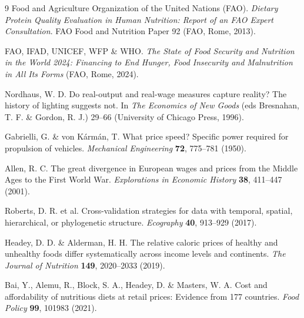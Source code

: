 \documentclass[11pt,a4paper]{article}
\begin{document}
\begin{thebibliography}{9}
Food and Agriculture Organization of the United Nations (FAO). \textit{Dietary Protein Quality Evaluation in Human Nutrition: Report of an FAO Expert Consultation}. FAO Food and Nutrition Paper 92 (FAO, Rome, 2013).

FAO, IFAD, UNICEF, WFP \& WHO. \textit{The State of Food Security and Nutrition in the World 2024: Financing to End Hunger, Food Insecurity and Malnutrition in All Its Forms} (FAO, Rome, 2024).

Nordhaus, W. D. Do real-output and real-wage measures capture reality? The history of lighting suggests not. In \textit{The Economics of New Goods} (eds Bresnahan, T. F. \& Gordon, R. J.) 29--66 (University of Chicago Press, 1996).

Gabrielli, G. \& von K\'arm\'an, T. What price speed? Specific power required for propulsion of vehicles. \textit{Mechanical Engineering} \textbf{72}, 775--781 (1950).

Allen, R. C. The great divergence in European wages and prices from the Middle Ages to the First World War. \textit{Explorations in Economic History} \textbf{38}, 411--447 (2001).

Roberts, D. R. et al. Cross-validation strategies for data with temporal, spatial, hierarchical, or phylogenetic structure. \textit{Ecography} \textbf{40}, 913--929 (2017).

Headey, D. D. \& Alderman, H. H. The relative caloric prices of healthy and unhealthy foods differ systematically across income levels and continents. \textit{The Journal of Nutrition} \textbf{149}, 2020--2033 (2019).

Bai, Y., Alemu, R., Block, S. A., Headey, D. \& Masters, W. A. Cost and affordability of nutritious diets at retail prices: Evidence from 177 countries. \textit{Food Policy} \textbf{99}, 101983 (2021).
\end{thebibliography}
\end{document}
